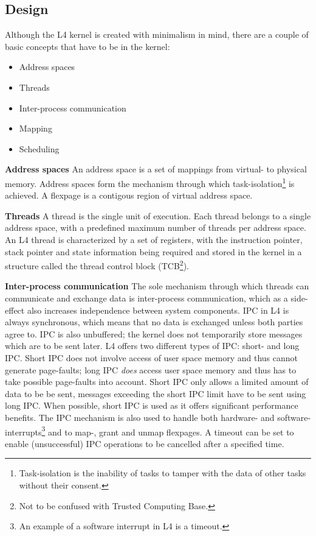 \subsection{Design}
Although the L4 kernel is created with minimalism in mind, there are a couple of basic concepts that have to be in the kernel:
\begin{itemize}
	\item Address spaces
	\item Threads		
	\item Inter-process communication
	\item Mapping
	\item Scheduling	
\end{itemize}

\textbf{Address spaces}
An address space is a set of mappings from virtual- to physical memory. Address spaces form the mechanism through which task-isolation\footnote{Task-isolation is the inability of tasks to tamper with the data of other tasks without their consent.} is achieved. A flexpage is a contigous region of virtual address space.\emptyline

\textbf{Threads}
A thread is the single unit of execution. Each thread belongs to a single address space, with a predefined maximum number of threads per address space. An L4 thread is characterized by a set of registers, with the instruction pointer, stack pointer and state information being required and stored in the kernel in a structure called the thread control block (TCB\footnote{Not to be confused with Trusted Computing Base.}). \emptyline

\textbf{Inter-process communication}
The sole mechanism through which threads can communicate and exchange data is inter-process communication, which as a side-effect also increases independence between system components. IPC in L4 is always synchronous, which means that no data is exchanged unless both parties agree to. IPC is also unbuffered; the kernel does not temporarily store messages which are to be sent later. L4 offers two different types of IPC: short- and long IPC. Short IPC does not involve access of user space memory and thus cannot generate page-faults; long IPC \textit{does} access user space memory and thus has to take possible page-faults into account. Short IPC only allows a limited amount of data to be be sent, messages exceeding the short IPC limit have to be sent using long IPC. When possible, short IPC is used as it offers significant performance benefits. The IPC mechanism is also used to handle both hardware- and software- interrupts\footnote{An example of a software interrupt in L4 is a timeout.} and to map-, grant and unmap flexpages. A timeout can be set to enable (unsuccessful) IPC operations to be cancelled after a specified time.\emptyline

